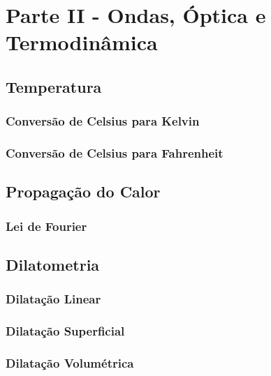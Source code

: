 \chapter{Parte II - Ondas, Óptica e Termodinâmica}


\section{Temperatura}

\subsection{Conversão de Celsius para Kelvin}

\subsection{Conversão de Celsius para Fahrenheit}






\section{Propagação do Calor}

\subsection{Lei de Fourier}








\section{Dilatometria}

\subsection{Dilatação Linear}

\subsection{Dilatação Superficial}

\subsection{Dilatação Volumétrica}








